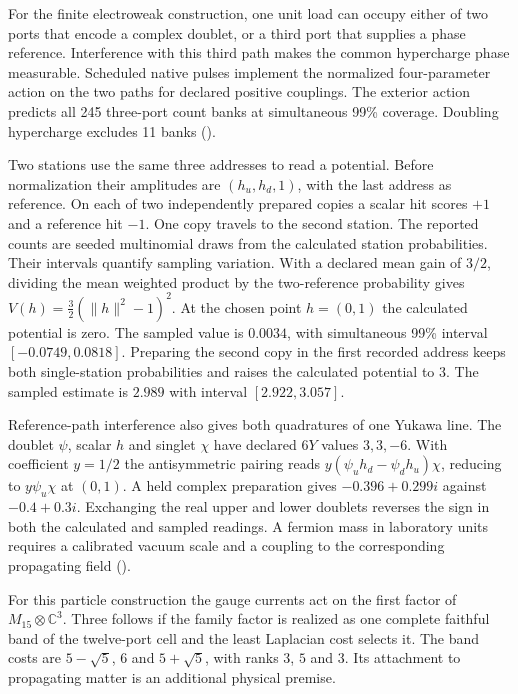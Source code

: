 \documentclass[11pt]{article}
\begin{document}
For the finite electroweak construction, one unit load can occupy
either of two ports that encode a complex doublet, or a third port
that supplies a phase reference. Interference with this third path
makes the common hypercharge phase measurable. Scheduled native pulses
implement the normalized four-parameter action on the two paths for
declared positive couplings. The exterior action predicts all 245
three-port count banks at simultaneous 99\% coverage. Doubling
hypercharge excludes 11 banks
().

Two stations use the same three addresses to read a potential. Before
normalization their amplitudes are $(h_u,h_d,1)$, with the last address
as reference. On each of two independently prepared copies a scalar hit
scores $+1$ and a reference hit $-1$. One copy travels to the second
station. The reported counts are seeded multinomial draws from the
calculated station probabilities. Their intervals quantify sampling variation.
With a declared mean gain of $3/2$, dividing the mean weighted
product by the two-reference probability gives
$V(h)=\tfrac32(\lVert h\rVert^2-1)^2$. At the chosen point $h=(0,1)$
the calculated potential is zero. The sampled value is $0.0034$, with
simultaneous 99\% interval
$[-0.0749,0.0818]$. Preparing the second copy in the first recorded
address keeps both single-station probabilities and raises the calculated
potential to $3$. The sampled estimate is $2.989$ with interval $[2.922,3.057]$.

Reference-path interference also gives both quadratures of one Yukawa
line. The doublet $\psi$, scalar $h$ and singlet $\chi$ have declared
$6Y$ values $3,3,-6$. With coefficient $y=1/2$ the antisymmetric
pairing reads $y(\psi_u h_d-\psi_d h_u)\chi$, reducing to
$y\psi_u\chi$ at $(0,1)$. A held complex preparation gives
$-0.396+0.299i$ against $-0.4+0.3i$. Exchanging the real upper and
lower doublets reverses the sign in both the calculated and sampled readings.
A fermion mass in laboratory units requires
a calibrated vacuum scale and a coupling to the corresponding propagating
field ().

For this particle construction the gauge currents act on the first factor
of $M_{15}\otimes\mathbb C^3$. Three follows if the family factor is realized
as one complete faithful band of the twelve-port cell and the least
Laplacian cost selects it. The band costs are $5-\sqrt5$, $6$ and $5+\sqrt5$,
with ranks $3$, $5$ and $3$. Its attachment to propagating matter is an
additional physical premise.
\end{document}

